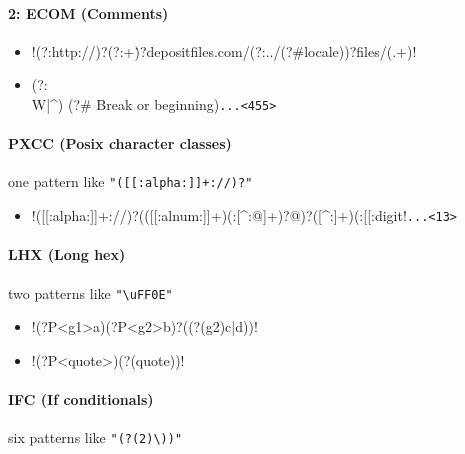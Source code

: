 \begin{footnotesize}
\vspace{-2mm}
\paragraph{2: ECOM (Comments)}
\begin{itemize}[noitemsep,topsep=0pt]
\item \cverb!(?:http://)?(?:\w+\.)?depositfiles.com/(?:../(?#locale))?files/(.+)!
\item \cverb@\n                     (?:\\W|^)    (?# Break or beginning)\n@\verb!...<455>!
\end{itemize}

\vspace{-2mm}
\paragraph{PXCC (Posix character classes)} one pattern like \verb!"([[:alpha:]]+://)?"!
\begin{itemize}[noitemsep,topsep=0pt]
\item \cverb!([[:alpha:]]+://)?(([[:alnum:]]+)(:[^:@]+)?@)?([^:]+)(:[[:digit!\verb!...<13>!
\end{itemize}

\vspace{-2mm}
\paragraph{LHX (Long hex)} two patterns like \verb!"\uFF0E"!
\begin{itemize}[noitemsep,topsep=0pt]
\item \cverb!(?P<g1>a)(?P<g2>b)?((?(g2)c|d))!
\item \cverb!(?P<quote>)(?(quote))!
\end{itemize}

\paragraph{IFC (If conditionals)} six patterns like \verb!"(?(2)\))"!
\begin{itemize}[noitemsep,topsep=0pt]
\item \cverb!^(\()?([^()]+)(?(1)\))$!
\item \cverb@(?<=[\w)\]"\']|([ ]))(===?|!==?|[<>]=?)(?=[\w({\["\']|(?(1)\b\b|[ ]))@
\item \cverb!(?<=[\w)\]"\']|([ ]))(=|[-+*/%
\item \cverb!(?<=[\w)\]"\']|([ ]))([-+*/%
\item \cverb!([^()]+?)\s*(\()?(\d{4})(?(2)\))$!
\item \cverb@^((?:https?://)?(?:youtu\\.be/|(?:\\w+\\.)?youtube(?:-nocookie@\verb!...<117>!
\end{itemize}


\end{footnotesize}

